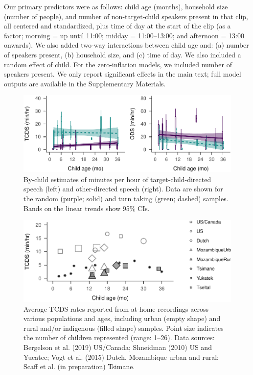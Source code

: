 \documentclass[floatsintext,man]{apa6}
\theoremstyle{definition}
\theoremstyle{definition}
\theoremstyle{definition}
\theoremstyle{remark}
\begin{document}
Our primary predictors were as follows: child age (months), household
size (number of people), and number of non-target-child speakers present
in that clip, all centered and standardized, plus time of day at the
start of the clip (as a factor; morning = up until 11:00; midday =
11:00--13:00; and afternoon = 13:00 onwards). We also added two-way
interactions between child age and: (a) number of speakers present, (b)
household size, and (c) time of day. We also included a random effect of
child. For the zero-inflation models, we included number of speakers
present. We only report significant effects in the main text; full model
outputs are available in the Supplementary Materials.

\begin{figure}
\centering
\includegraphics{Tseltal-CLE_files/figure-latex/fig3-1.pdf}
\caption{\label{fig:fig3}By-child estimates of minutes per hour of
target-child-directed speech (left) and other-directed speech (right).
Data are shown for the random (purple; solid) and turn taking (green;
dashed) samples. Bands on the linear trends show 95\% CIs.}
\end{figure}

\begin{figure}
\centering
\includegraphics{Tseltal-CLE_files/figure-latex/fig4-1.pdf}
\caption{\label{fig:fig4}Average TCDS rates reported from at-home recordings
across various populations and ages, including urban (empty shape) and
rural and/or indigenous (filled shape) samples. Point size indicates the
number of children represented (range: 1--26). Data sources: Bergelson
et al. (2019) US/Canada; Shneidman (2010) US and Yucatec; Vogt et al.
(2015) Dutch, Mozambique urban and rural; Scaff et al. (in preparation)
Tsimane.}
\end{figure}
\end{document}
